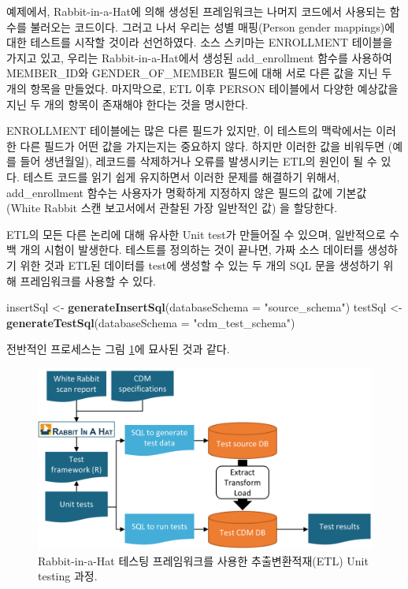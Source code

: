 \documentclass[11pt]{book}
\newenvironment{Shaded}{\begin{snugshade}}{\end{snugshade}}
\newcommand{\KeywordTok}[1]{\textcolor[rgb]{0.13,0.29,0.53}{\textbf{#1}}}
\newcommand{\DataTypeTok}[1]{\textcolor[rgb]{0.13,0.29,0.53}{#1}}
\newcommand{\StringTok}[1]{\textcolor[rgb]{0.31,0.60,0.02}{#1}}
\newcommand{\NormalTok}[1]{#1}
\theoremstyle{definition}
\theoremstyle{definition}
\theoremstyle{definition}
\theoremstyle{remark}
\begin{document}
예제에서, Rabbit-in-a-Hat에 의해 생성된 프레임워크는 나머지 코드에서
사용되는 함수를 불러오는 코드이다. 그러고 나서 우리는 성별 매핑(Person
gender mappings)에 대한 테스트를 시작할 것이라 선언하였다. 소스 스키마는
ENROLLMENT 테이블을 가지고 있고, 우리는 Rabbit-in-a-Hat에서 생성된
add\_enrollment 함수를 사용하여 MEMBER\_ID와 GENDER\_OF\_MEMBER 필드에
대해 서로 다른 값을 지닌 두 개의 항목을 만들었다. 마지막으로, ETL 이후
PERSON 테이블에서 다양한 예상값을 지닌 두 개의 항목이 존재해야 한다는
것을 명시한다.

ENROLLMENT 테이블에는 많은 다른 필드가 있지만, 이 테스트의 맥락에서는
이러한 다른 필드가 어떤 값을 가지는지는 중요하지 않다. 하지만 이러한
값을 비워두면 (예를 들어 생년월일), 레코드를 삭제하거나 오류를
발생시키는 ETL의 원인이 될 수 있다. 테스트 코드를 읽기 쉽게 유지하면서
이러한 문제를 해결하기 위해서, add\_enrollment 함수는 사용자가 명확하게
지정하지 않은 필드의 값에 기본값 (White Rabbit 스캔 보고서에서 관찰된
가장 일반적인 값) 을 할당한다.

ETL의 모든 다른 논리에 대해 유사한 Unit test가 만들어질 수 있으며,
일반적으로 수백 개의 시험이 발생한다. 테스트를 정의하는 것이 끝나면,
가짜 소스 데이터를 생성하기 위한 것과 ETL된 데이터를 test에 생성할 수
있는 두 개의 SQL 문을 생성하기 위해 프레임워크를 사용할 수 있다.

\begin{Shaded}
\begin{Highlighting}[]
\NormalTok{insertSql <-}\StringTok{ }\KeywordTok{generateInsertSql}\NormalTok{(}\DataTypeTok{databaseSchema =} \StringTok{"source_schema"}\NormalTok{)}
\NormalTok{testSql <-}\StringTok{ }\KeywordTok{generateTestSql}\NormalTok{(}\DataTypeTok{databaseSchema =} \StringTok{"cdm_test_schema"}\NormalTok{)}
\end{Highlighting}
\end{Shaded}

전반적인 프로세스는 그림 \ref{fig:testFramework}에 묘사된 것과 같다.

\begin{figure}

{\centering \includegraphics[width=0.9\linewidth]{images/DataQuality/testFramework} 

}

\caption{Rabbit-in-a-Hat 테스팅 프레임워크를 사용한 추출변환적재(ETL) Unit testing 과정.}\label{fig:testFramework}
\end{figure}
\end{document}
